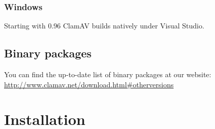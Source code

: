 \documentclass[a4paper,titlepage,12pt]{article}
\begin{document}
	\subsubsection{Windows}
	Starting with 0.96 ClamAV builds natively under Visual Studio.

    \subsection{Binary packages}
    You can find the up-to-date list of binary packages at our website:
    \url{http://www.clamav.net/download.html#otherversions}

    \section{Installation}
\end{document}
